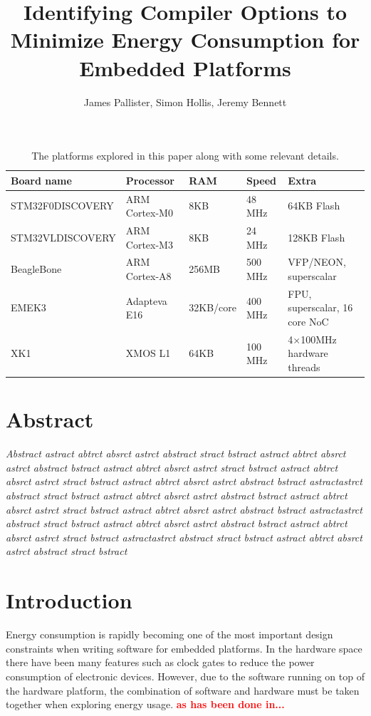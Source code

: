 \documentclass[twocolumn]{article}
\title{\bfseries Identifying Compiler Options to Minimize Energy Consumption for Embedded Platforms}
\author{James Pallister, Simon Hollis, Jeremy Bennett}
\newcommand{\todo}[1]{\textbf{\textcolor{red}{#1}}}
\begin{document}
\maketitle

\begin{table}[!hbt]
	\begin{tabular}{l l l l l}
		\textbf{Board name} & \textbf{Processor} & \textbf{RAM} & \textbf{Speed} & \textbf{Extra} \\
		\hline
		STM32F0DISCOVERY	& ARM Cortex-M0 		& 8KB		& 48 MHz		  & 64KB Flash\\
		STM32VLDISCOVERY	& ARM Cortex-M3 		& 8KB		& 24 MHz		  & 128KB Flash\\
		BeagleBone			& ARM Cortex-A8 		& 256MB		& 500 MHz		  & VFP/NEON, superscalar\\
		EMEK3				& Adapteva E16 			& 32KB/core & 400 MHz		  & FPU, superscalar, 16 core NoC\\
		XK1					& XMOS L1 				& 64KB		& 100 MHz 		& 4$\times$100MHz hardware threads \\
	\end{tabular}
	\caption{The platforms explored in this paper along with some relevant details.}
	\label{Table:Platforms}
\end{table}

\section*{Abstract}

\textit{
Abstract astract abtrct absrct astrct abstract stract bstract
astract abtrct absrct astrct abstract bstract
astract abtrct absrct astrct stract bstract
astract abtrct absrct astrct stract bstract
astract abtrct absrct astrct abstract bstract
astractastrct abstract stract bstract
astract abtrct absrct astrct abstract bstract
astract abtrct absrct astrct stract bstract
astract abtrct absrct astrct abstract bstract
astractastrct abstract stract bstract
astract abtrct absrct astrct abstract bstract
astract abtrct absrct astrct stract bstract
astractastrct abstract stract bstract
astract abtrct absrct astrct abstract stract bstract
}

\section*{Introduction}


Energy consumption is rapidly becoming one of the most important design constraints when writing software for embedded platforms. In the hardware space there have been many features such as clock gates to reduce the power consumption of electronic devices. However, due to the software running on top of the hardware platform, the combination of software and hardware must be taken together when exploring energy usage. \todo{as has been done in...}
\end{document}
